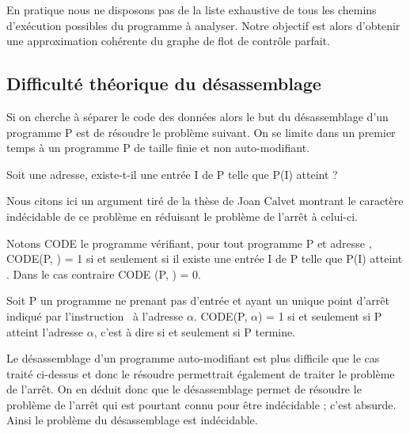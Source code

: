En pratique nous ne disposons pas de la liste exhaustive de tous les chemins d'exécution possibles du programme à analyser. Notre objectif est alors d'obtenir une approximation cohérente du graphe de flot de contrôle parfait. 



\subsection{Difficulté théorique du désassemblage}
Si on cherche à séparer le code des données alors le but du désassemblage d'un programme P est de résoudre le problème suivant. On se limite dans un premier temps à un programme P de taille finie et non auto-modifiant.
\begin{pb}
Soit  une adresse, existe-t-il une entrée I de P telle que P(I) atteint  ?
\end{pb}

Nous citons ici un argument tiré de la thèse de Joan Calvet \cite{Calvet2013} montrant le caractère indécidable de ce problème en réduisant le problème de l'arrêt à celui-ci.

Notons CODE le programme vérifiant, pour tout programme P et adresse , CODE(P, ) = 1 si et seulement si il existe une entrée I de P telle que P(I) atteint . Dans le cas contraire CODE (P, ) = 0.

Soit P un programme ne prenant pas d'entrée et ayant un unique point d'arrêt indiqué par l'instruction \halt\ à l'adresse $\alpha$.
CODE(P, $\alpha$) = 1 si et seulement si P atteint l'adresse $\alpha$, c'est à dire si et seulement si P termine.

Le désassemblage d'un programme auto-modifiant est plus difficile que le cas traité ci-dessus et donc le résoudre permettrait également de traiter le problème de l'arrêt.
On en déduit donc que le désassemblage permet de résoudre le problème de l'arrêt qui est pourtant connu pour être indécidable ; c'est absurde.
Ainsi le problème du désassemblage est indécidable.


